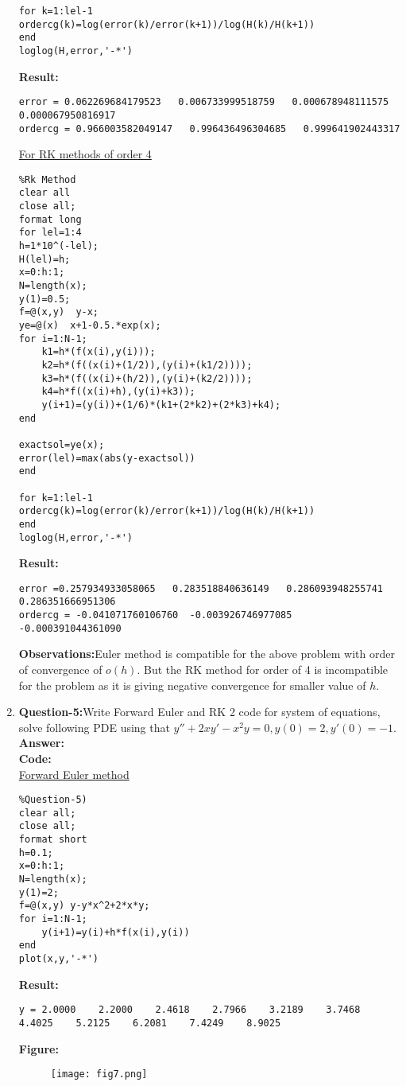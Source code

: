 \documentclass{article}
\begin{document}
\begin{enumerate}
\begin{lstlisting}
for k=1:lel-1
ordercg(k)=log(error(k)/error(k+1))/log(H(k)/H(k+1))
end
loglog(H,error,'-*')
\end{lstlisting}
\textbf{Result:}
\begin{lstlisting}
error = 0.062269684179523   0.006733999518759   0.000678948111575   0.000067950816917
ordercg = 0.966003582049147   0.996436496304685   0.999641902443317
\end{lstlisting}
\underline{For RK methods of order 4}
\begin{lstlisting}
%Rk Method
clear all
close all;
format long
for lel=1:4
h=1*10^(-lel);
H(lel)=h;
x=0:h:1;
N=length(x);
y(1)=0.5; 
f=@(x,y)  y-x;
ye=@(x)  x+1-0.5.*exp(x);
for i=1:N-1;
    k1=h*(f(x(i),y(i)));
    k2=h*(f((x(i)+(1/2)),(y(i)+(k1/2))));
    k3=h*(f((x(i)+(h/2)),(y(i)+(k2/2))));
    k4=h*f((x(i)+h),(y(i)+k3));
    y(i+1)=(y(i))+(1/6)*(k1+(2*k2)+(2*k3)+k4);
end

exactsol=ye(x);
error(lel)=max(abs(y-exactsol))
end

for k=1:lel-1
ordercg(k)=log(error(k)/error(k+1))/log(H(k)/H(k+1))
end
loglog(H,error,'-*')

\end{lstlisting}
\textbf{Result:}
\begin{lstlisting}
error =0.257934933058065   0.283518840636149   0.286093948255741   0.286351666951306
ordercg = -0.041071760106760  -0.003926746977085  -0.000391044361090
\end{lstlisting}
\textbf{Observations:}Euler method is compatible for the above problem with order of convergence of $o(h)$. But the RK method for order of 4 is incompatible for the problem as it is giving negative convergence for smaller value of $h$. 
\item \textbf{Question-5:}Write Forward Euler and RK 2 code for system of equations, solve following PDE using that $y'' + 2xy'-x^2y=0, y(0)=2, y'(0)=-1.$\\
\textbf{Answer:}\\
\textbf{Code:}\\
\underline{Forward Euler method}
\begin{lstlisting}
%Question-5)
clear all;
close all;
format short 
h=0.1;
x=0:h:1;
N=length(x);
y(1)=2;
f=@(x,y) y-y*x^2+2*x*y;
for i=1:N-1;
    y(i+1)=y(i)+h*f(x(i),y(i))
end
plot(x,y,'-*')

\end{lstlisting}
\textbf{Result:}
\begin{lstlisting}
y = 2.0000    2.2000    2.4618    2.7966    3.2189    3.7468    4.4025    5.2125    6.2081    7.4249    8.9025
\end{lstlisting}
\textbf{Figure:}
\begin{figure}[H]                                 
	  \centering                          
	  \texttt{[image: fig7.png]}
\caption{}
\label{fig:1.7}                        
  \end{figure}


\end{enumerate}
\end{document}
